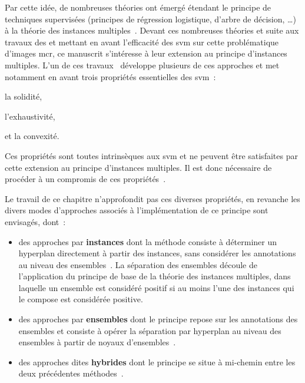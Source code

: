 Par cette idée, de nombreuses théories ont émergé étendant le principe de techniques supervisées (principes de régression logistique, d'arbre de décision, \ldots) à la théorie des instances multiples~\cite{Maron1998,Xu2004,Blockeel2005}. Devant ces nombreuses théories et suite aux travaux des  et  mettant en avant l'efficacité des \gls{svm} sur cette problématique d'images \gls{mcr}, ce manuscrit s'intéresse à leur extension au principe d'instances multiples. L'un de ces travaux~\cite{Doran2013} développe plusieurs de ces approches et met notamment en avant trois propriétés essentielles des \gls{svm}~:
\begin{inlinerate}
    \item la solidité,
    \item l'exhaustivité,
    \item et la convexité.
\end{inlinerate} Ces propriétés sont toutes intrinsèques aux \gls{svm} et ne peuvent être satisfaites par cette extension au principe d'instances multiples. Il est donc nécessaire de procéder à un compromis de ces propriétés~\cite{Doran2013}.\par

Le travail de ce chapitre n'approfondit pas ces diverses propriétés, en revanche les divers modes d'approches associés à l'implémentation de ce principe sont envisagés, dont~: 
\begin{itemize}
    \item des approches par \textbf{instances} dont la méthode consiste à déterminer un hyperplan directement à partir des instances, sans considérer les annotations au niveau des ensembles~\cite{Andrews2003}. La séparation des ensembles découle de l'application du principe de base de la théorie des instances multiples, dans laquelle un ensemble est considéré positif si au moins l'une des instances qui le compose est considérée positive.
    \item des approches par \textbf{ensembles} dont le principe repose sur les annotations des ensembles et consiste à opérer la séparation par hyperplan au niveau des ensembles à partir de noyaux d'ensembles~\cite{Gartner2002}.
    \item des approches dites \textbf{hybrides} dont le principe se situe à mi-chemin entre les deux précédentes méthodes~\cite{Bunescu2007}.
\end{itemize}\par 


